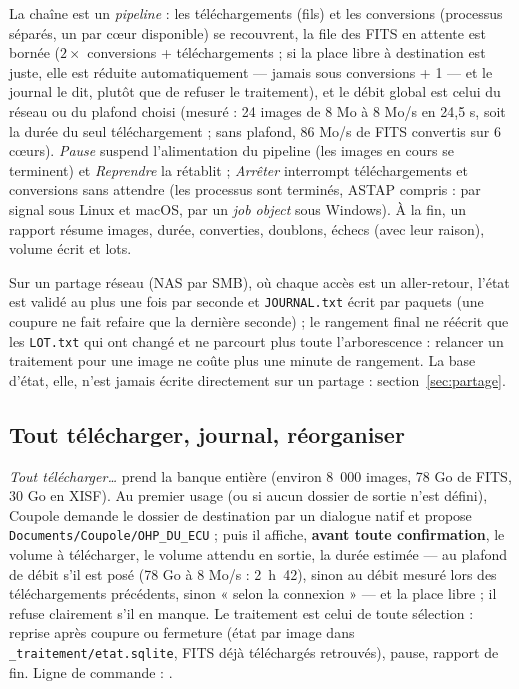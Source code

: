 La chaîne est un \emph{pipeline} : les téléchargements (fils) et les conversions (processus séparés, un par cœur
disponible) se recouvrent, la file des FITS en attente est bornée ($2\times$ conversions + téléchargements ; si la
place libre à destination est juste, elle est réduite automatiquement — jamais sous conversions + 1 — et le journal le
dit, plutôt que de refuser le traitement), et le
débit global est celui du réseau ou du plafond choisi (mesuré : 24 images de 8 Mo à 8 Mo/s en 24,5 s, soit la durée
du seul téléchargement ; sans plafond, 86 Mo/s de FITS convertis sur 6 cœurs). \emph{Pause} suspend
l'alimentation du pipeline (les images en cours se terminent) et \emph{Reprendre} la rétablit ; \emph{Arrêter}
interrompt téléchargements et conversions sans attendre (les processus sont terminés, ASTAP compris : par signal
sous Linux et macOS, par un \emph{job object} sous Windows). À la fin, un
rapport résume images, durée, converties, doublons, échecs (avec leur raison), volume écrit et lots.

Sur un partage réseau (NAS par SMB), où chaque accès est un aller-retour, l'état est validé au plus une fois par
seconde et \texttt{JOURNAL.txt} écrit par paquets (une coupure ne fait refaire que la dernière seconde) ; le rangement
final ne réécrit que les \texttt{LOT.txt} qui ont changé et ne parcourt plus toute l'arborescence : relancer un
traitement pour une image ne coûte plus une minute de rangement.
La base d'état, elle, n'est jamais écrite directement sur un partage : section~\ref{sec:partage}.

\subsection{Tout télécharger, journal, réorganiser}\label{sec:tout}
\emph{Tout télécharger…} prend la banque entière (environ 8~000 images, 78 Go de FITS, 30 Go en XISF). Au premier
usage (ou si aucun dossier de sortie n'est défini), Coupole demande le dossier de destination par un dialogue natif et
propose \texttt{Documents/Coupole/OHP\_DU\_ECU} ; puis il affiche, \textbf{avant toute confirmation}, le volume à
télécharger, le volume attendu en sortie, la durée estimée --- au plafond de débit s'il est posé (78 Go à 8 Mo/s : 2~h~42), sinon au débit mesuré
lors des téléchargements précédents, sinon « selon la connexion » --- et la place
libre ; il refuse clairement s'il en manque. Le traitement est celui de toute sélection : reprise après coupure ou
fermeture (état par image dans \texttt{\_traitement/etat.sqlite}, FITS déjà téléchargés retrouvés), pause, rapport
de fin. Ligne de commande : .

